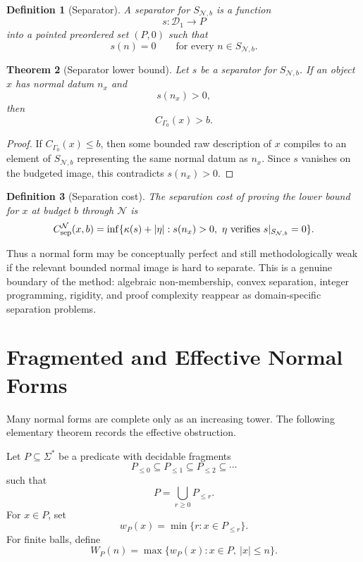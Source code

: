 \documentclass[11pt]{article}
\newtheorem{theorem}{Theorem}[section]
\newtheorem{definition}[theorem]{Definition}
\begin{document}
\begin{definition}[Separator]
A separator for \(S_{\mathcal N,b}\) is a function
\[
s:\mathcal D_1\to P
\]
into a pointed preordered set \((P,0)\) such that
\[
s(n)=0
\qquad
\text{for every } n\in S_{\mathcal N,b}.
\]
\end{definition}

\begin{theorem}[Separator lower bound]
Let \(s\) be a separator for \(S_{\mathcal N,b}\). If an object \(x\) has normal datum \(n_x\) and
\[
s(n_x)>0,
\]
then
\[
C_{\Gamma_0}(x)>b.
\]
\end{theorem}

\begin{proof}
If \(C_{\Gamma_0}(x)\leq b\), then some bounded raw description of \(x\) compiles to an element of \(S_{\mathcal N,b}\) representing the same normal datum as \(n_x\). Since \(s\) vanishes on the budgeted image, this contradicts \(s(n_x)>0\).
\end{proof}

\begin{definition}[Separation cost]
The separation cost of proving the lower bound for \(x\) at budget \(b\) through \(\mathcal N\) is
\[
C_{\rm sep}^{\mathcal N}(x,b)
=
\inf\{\kappa(s)+|\eta|:
s(n_x)>0,\ \eta\ \text{verifies } s|_{S_{\mathcal N,b}}=0\}.
\]
\end{definition}

Thus a normal form may be conceptually perfect and still methodologically weak if the relevant bounded normal image is hard to separate. This is a genuine boundary of the method: algebraic non-membership, convex separation, integer programming, rigidity, and proof complexity reappear as domain-specific separation problems.

\section{Fragmented and Effective Normal Forms}

Many normal forms are complete only as an increasing tower. The following elementary theorem records the effective obstruction.

Let \(P\subseteq\Sigma^\ast\) be a predicate with decidable fragments
\[
P_{\leq0}\subseteq P_{\leq1}\subseteq P_{\leq2}\subseteq\cdots
\]
such that
\[
P=\bigcup_{r\geq0}P_{\leq r}.
\]
For \(x\in P\), set
\[
w_P(x)=\min\{r:x\in P_{\leq r}\}.
\]
For finite balls, define
\[
W_P(n)=\max\{w_P(x):x\in P,\ |x|\leq n\}.
\]
\end{document}
